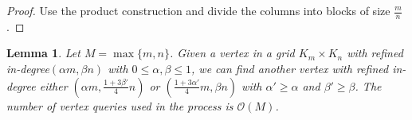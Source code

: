 \documentclass[a4paper,10pt]{article}
\newtheorem{lemma}{Lemma}
\newcommand{\JN}[1]{\marginpar{\parbox{4cm}{{\small {\bf JN:} #1}}}} %
\newcommand{\indegree}{refined in-degree\xspace}
\begin{document}
\begin{proof}
 Use the product construction and divide the columns into blocks of size $\frac{m}{n}$.
 
 
\end{proof}



\begin{lemma}
 Let $M = \max\{m,n\}$. Given a vertex  in a grid $K_{m} \times K_{n}$ with \indegree $(\alpha m,\beta n)$ with $0 \leq \alpha, \beta \leq 1$, we can find another vertex with \indegree either $\left(\alpha m,\frac{1+3\beta'}{4} n\right)$ or $\left(\frac{1+3\alpha'}{4} m, \beta n\right)$ with $\alpha' \geq \alpha$ and $\beta ' \geq \beta$. The number of vertex queries used in the process is $\mathcal{O}(M)$.
\end{lemma}
\end{document}
